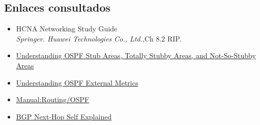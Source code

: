 \documentclass[letterpaper,12pt]{article}
\begin{document}
	\subsection{Enlaces consultados}
		\begin{itemize}
			\item{HCNA Networking Study Guide}  \\
			\textit{Springer. Huawei Technologies Co., Ltd.},Ch 8.2 RIP.
			\item \href{https://www.juniper.net/documentation/en_US/junos/topics/concept/ospf-stub-áreas-overview.html}
			{Understanding OSPF Stub Areas, Totally Stubby Areas, and Not-So-Stubby Areas}
			\item \href{https://www.juniper.net/documentation/en_US/junos/topics/concept/ospf-routing-external-metrics-overview.html}
			{Understanding OSPF External Metrics}
			\item \href{https://wiki.mikrotik.com/wiki/Manual:Routing/OSPF}
			{Manual:Routing/OSPF}
			\item \href{http://bgphelp.com/2017/03/05/bgp-next-hop-self-explained/}{BGP Next-Hop Self Explained}
		\end{itemize}
\end{document}

